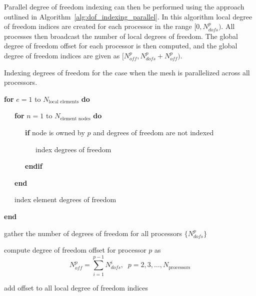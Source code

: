 Parallel degree of freedom indexing can then be performed using the approach outlined in Algorithm~\ref{alg:dof_indexing_parallel}. In this algorithm local degree of freedom indices are created for each processor in the range $[0,N_{dofs}^p)$.  All processes then broadcast the number of local degrees of freedom.  The global degree of freedom offset for each processor is then computed, and the global degree of freedom indices are given as $[N_{off}^p,N_{dofs}^p+N_{off}^p)$.
\begin{algorithm}[htbp]
  \centering
  \caption{Indexing degrees of freedom for the case when the mesh is parallelized across all processors.\label{alg:dof_indexing_parallel}}
   \begin{minipage}{.95\textwidth}
     \noindent
     \sffamily
     \setcounter{alines}{0}
     \begin{list}{:\ \ }{}
       \renewcommand{\baselinestretch}{1.0} \setlength{\itemsep}{-1ex}
   	\item \textbf{for} $e=1$ to $N_{\text{local elements}}$ \textbf{do}
   	\item \ \ \ \textbf{for} $n=1$ to $N_{\text{element nodes}}$ \textbf{do}
   	\item \ \ \ \ \ \ \textbf{if} node is owned by $p$ and degrees of freedom are not indexed
   	\item \ \ \ \ \ \ \ \ \ index degrees of freedom
   	\item \ \ \ \ \ \ \textbf{endif}
   	\item \ \ \ \textbf{end}
   	\item \ \ \ index element degrees of freedom
   	\item \textbf{end}
   	\item gather the number of degrees of freedom for all processors $\{ N_{dofs}^p \}$
   	\item compute degree of freedom offset for processor $p$ as
   	  \begin{equation*}
   	    N_{off}^p=\sum_{i=1}^{p-1} N_{dofs}^i,\;\; p=2,3,\ldots,N_{\text{processors}}
   	  \end{equation*}
   	\item add offset to all local degree of freedom indices
     \end{list}
   \end{minipage}
\end{algorithm}

